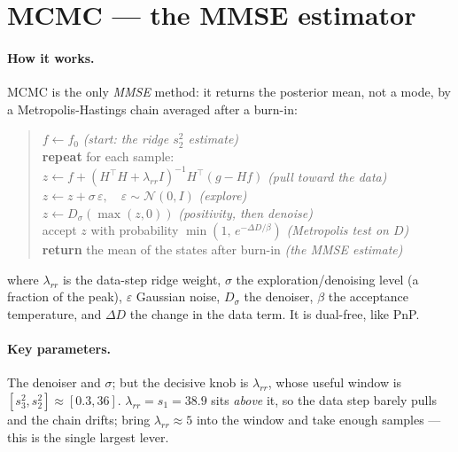 \section{MCMC --- the MMSE estimator}
\label{sec:mcmc}

\paragraph{How it works.}
MCMC is the only \emph{MMSE} method: it returns the posterior mean, not a mode, by a
Metropolis-Hastings chain averaged after a burn-in:
\begin{quote}
$f \leftarrow f_0$ \hfill\textit{(start: the ridge $s_2^2$ estimate)}\\
\textbf{repeat} for each sample:\\
\hspace{1.2em}$z \leftarrow f + (H^{\!\top}\!H+\lambda_{rr} I)^{-1} H^{\!\top}(g-Hf)$ \hfill\textit{(pull toward the data)}\\
\hspace{1.2em}$z \leftarrow z + \sigma\,\varepsilon,\quad \varepsilon\sim\mathcal N(0,I)$ \hfill\textit{(explore)}\\
\hspace{1.2em}$z \leftarrow D_\sigma(\max(z,0))$ \hfill\textit{(positivity, then denoise)}\\
\hspace{1.2em}accept $z$ with probability $\min(1,\,e^{-\Delta D/\beta})$ \hfill\textit{(Metropolis test on $D$)}\\
\textbf{return} the mean of the states after burn-in \hfill\textit{(the MMSE estimate)}
\end{quote}
\noindent where $\lambda_{rr}$ is the data-step ridge weight, $\sigma$ the exploration/denoising
level (a fraction of the peak), $\varepsilon$ Gaussian noise, $D_\sigma$ the denoiser, $\beta$ the
acceptance temperature, and $\Delta D$ the change in the data term. It is dual-free, like PnP.

\paragraph{Key parameters.}
The denoiser and $\sigma$; but the decisive knob is $\lambda_{rr}$, whose useful window is
$[s_3^2,s_2^2]\approx[0.3,36]$. $\lambda_{rr}=s_1=38.9$ sits \emph{above} it,
so the data step barely pulls and the chain drifts; bring $\lambda_{rr}\approx5$ into the window
and take enough samples --- this is the single largest lever.

